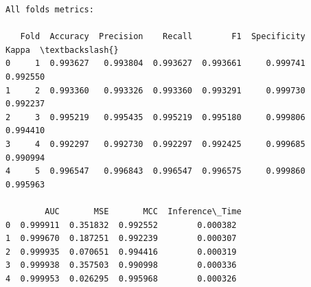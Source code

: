 \documentclass[11pt]{article}
\begin{document}
\begin{Verbatim}[commandchars=\\\{\}]
All folds metrics:

   Fold  Accuracy  Precision    Recall        F1  Specificity     Kappa  \textbackslash{}
0     1  0.993627   0.993804  0.993627  0.993661     0.999741  0.992550
1     2  0.993360   0.993326  0.993360  0.993291     0.999730  0.992237
2     3  0.995219   0.995435  0.995219  0.995180     0.999806  0.994410
3     4  0.992297   0.992730  0.992297  0.992425     0.999685  0.990994
4     5  0.996547   0.996843  0.996547  0.996575     0.999860  0.995963

        AUC       MSE       MCC  Inference\_Time
0  0.999911  0.351832  0.992552        0.000382
1  0.999670  0.187251  0.992239        0.000307
2  0.999935  0.070651  0.994416        0.000319
3  0.999938  0.357503  0.990998        0.000336
4  0.999953  0.026295  0.995968        0.000326
    \end{Verbatim}
\end{document}
